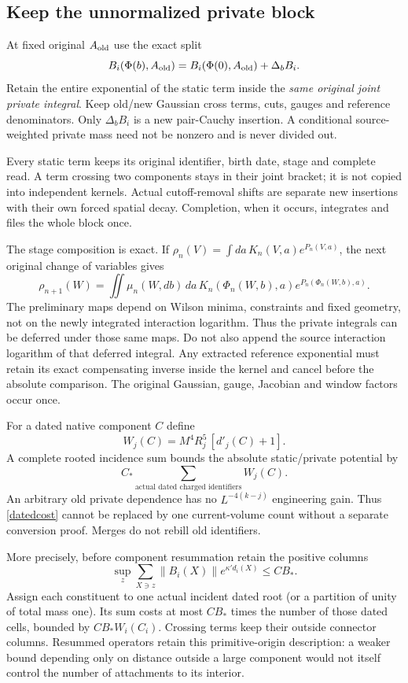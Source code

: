 \documentclass[11pt]{article}
\theoremstyle{definition}\newtheorem{definition}[theorem]{Definition}
\theoremstyle{remark}\newtheorem{remark}[theorem]{Remark}
\begin{document}
\subsection{Keep the unnormalized private block}
At fixed original $A_{\rm old}$ use the exact split
\begin{equation}
 B_i(\Phi(b),A_{\rm old})=
 B_i(\Phi(0),A_{\rm old})+\Delta_bB_i. \label{privatesplit}
\end{equation}
Retain the entire exponential of the static term inside the \emph{same original joint private integral}. Keep old/new Gaussian cross terms, cuts, gauges and reference denominators. Only $\Delta_bB_i$ is a new pair-Cauchy insertion. A conditional source-weighted private mass need not be nonzero and is never divided out.

Every static term keeps its original identifier, birth date, stage and complete read. A term crossing two components stays in their joint bracket; it is not copied into independent kernels. Actual cutoff-removal shifts are separate new insertions with their own forced spatial decay. Completion, when it occurs, integrates and files the whole block once.

The stage composition is exact. If $\rho_n(V)=\int da\,K_n(V,a)e^{P_n(V,a)}$, the next original change of variables gives
\[
 \rho_{n+1}(W)=\iint\mu_n(W,db)\,da\,
 K_n(\Phi_n(W,b),a)e^{P_n(\Phi_n(W,b),a)}.
\]
The preliminary maps depend on Wilson minima, constraints and fixed geometry, not on the newly integrated interaction logarithm. Thus the private integrals can be deferred under those same maps. Do not also append the source interaction logarithm of that deferred integral. Any extracted reference exponential must retain its exact compensating inverse inside the kernel and cancel before the absolute comparison. The original Gaussian, gauge, Jacobian and window factors occur once.

For a dated native component $C$ define
\[
 W_j(C)=M^4R_j^5\,[d'_j(C)+1].
\]
A complete rooted incidence sum bounds the absolute static/private potential by
\begin{equation}
 C_*\sum_{\text{actual dated charged identifiers}}W_j(C). \label{datedcost}
\end{equation}
An arbitrary old private dependence has no $L^{-4(k-j)}$ engineering gain. Thus \eqref{datedcost} cannot be replaced by one current-volume count without a separate conversion proof. Merges do not rebill old identifiers.

More precisely, before component resummation retain the positive columns
\[
 \sup_z\sum_{X\ni z}\|B_i(X)\|e^{\kappa' d_i(X)}\leq C B_*.
\]
Assign each constituent to one actual incident dated root (or a partition of unity of total mass one). Its sum costs at most $CB_*$ times the number of those dated cells, bounded by $CB_*W_i(C_i)$. Crossing terms keep their outside connector columns. Resummed operators retain this primitive-origin description: a weaker bound depending only on distance outside a large component would not itself control the number of attachments to its interior.
\end{document}
